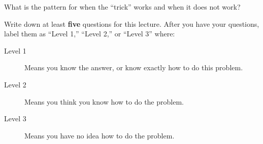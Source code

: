 \documentclass{ximera}
\begin{document}
\begin{problem}
  What is the pattern for when the ``trick'' works and when it does not work?
  \begin{freeResponse}
\end{freeResponse}
\end{problem}



\begin{xarmaBoost}
  Write down at least \textbf{five} questions for this lecture. After
  you have your questions, label them as ``Level 1,'' ``Level 2,'' or
  ``Level 3'' where:
\begin{description}
\item[Level 1] Means you know the answer, or know exactly how to do
  this problem.
\item[Level 2] Means you think you know how to do the problem.
\item[Level 3] Means you have no idea how to do the problem.
\end{description}
\begin{freeResponse}
\end{freeResponse}
\end{xarmaBoost}
\end{document}
